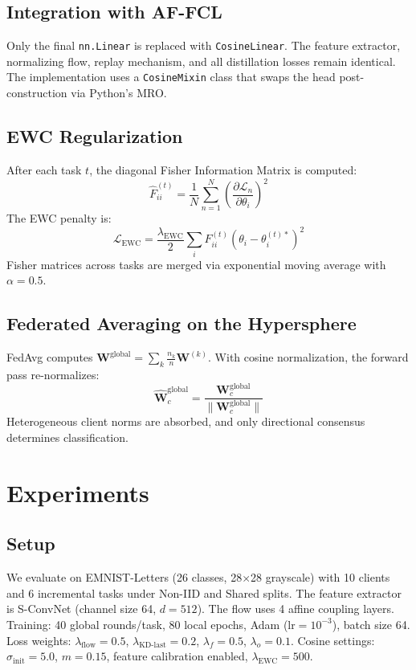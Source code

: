 \documentclass[conference]{IEEEtran}
\begin{document}
\subsection{Integration with AF-FCL}
Only the final \texttt{nn.Linear} is replaced with \texttt{CosineLinear}. The feature extractor, normalizing flow, replay mechanism, and all distillation losses remain identical. The implementation uses a \texttt{CosineMixin} class that swaps the head post-construction via Python's MRO.

\subsection{EWC Regularization}
After each task $t$, the diagonal Fisher Information Matrix is computed:
\begin{equation}
\hat{F}_{ii}^{(t)} = \frac{1}{N}\sum_{n=1}^{N}\left(\frac{\partial\mathcal{L}_n}{\partial\theta_i}\right)^2
\end{equation}
The EWC penalty is:
\begin{equation}
\mathcal{L}_{\text{EWC}} = \frac{\lambda_{\text{EWC}}}{2}\sum_i F_{ii}^{(t)}(\theta_i - \theta_i^{(t)*})^2
\end{equation}
Fisher matrices across tasks are merged via exponential moving average with $\alpha{=}0.5$.

\subsection{Federated Averaging on the Hypersphere}
FedAvg computes $\mathbf{W}^{\text{global}} = \sum_k \frac{n_k}{n}\mathbf{W}^{(k)}$. With cosine normalization, the forward pass re-normalizes:
\begin{equation}
\hat{\mathbf{W}}_c^{\text{global}} = \frac{\mathbf{W}_c^{\text{global}}}{\|\mathbf{W}_c^{\text{global}}\|}
\end{equation}
Heterogeneous client norms are absorbed, and only directional consensus determines classification.

\section{Experiments}

\subsection{Setup}
We evaluate on EMNIST-Letters (26 classes, 28$\times$28 grayscale) with 10 clients and 6 incremental tasks under Non-IID and Shared splits. The feature extractor is S-ConvNet (channel size 64, $d{=}512$). The flow uses 4 affine coupling layers. Training: 40 global rounds/task, 80 local epochs, Adam ($\text{lr}{=}10^{-3}$), batch size 64. Loss weights: $\lambda_{\text{flow}}{=}0.5$, $\lambda_{\text{KD-last}}{=}0.2$, $\lambda_f{=}0.5$, $\lambda_o{=}0.1$. Cosine settings: $\sigma_{\text{init}}{=}5.0$, $m{=}0.15$, feature calibration enabled, $\lambda_{\text{EWC}}{=}500$.
\end{document}
